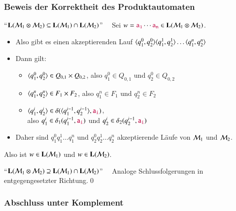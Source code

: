 \documentclass[onlymath]{beamer}
\begin{document}
\begin{frame}\frametitle{Beweis der Korrektheit des Produktautomaten}

"`$\textbf{\textcolor{black}{L}}(\mathcal{M}_1\otimes\mathcal{M}_2) \subseteq \textbf{\textcolor{black}{L}}(\mathcal{M}_1)\cap\textbf{\textcolor{black}{L}}(\mathcal{M}_2)$"'~~ Sei $w=\mathtt{\textcolor{purple}{a_1}}\cdots\mathtt{\textcolor{purple}{a_n}}\in\textbf{\textcolor{black}{L}}(\mathcal{M}_1\otimes\mathcal{M}_2)$.\pause
\begin{itemize}
\item Also gibt es einen akzeptierenden Lauf $\langle{q_1^0,q_2^0}\rangle\langle{q_1^1,q_2^1}\rangle\ldots\langle{q_1^n,q_2^n}\rangle$\pause
\item Dann gilt:
\begin{itemize}
\item $\langle{q_1^0,q_2^0}\rangle\in Q_{0,1}\times Q_{0,2}$, also $q_1^0\in Q_{0,1}$ und $q_2^0\in Q_{0,2}$
\item $\langle{q_1^n,q_2^n}\rangle\in F_1\times F_2$, also $q_1^n\in F_1$ und $q_2^n\in F_2$
\item $\langle{q_1^i,q_2^i}\rangle\in \delta(\langle{q_1^{i-1},q_2^{i-1}}\rangle,\mathtt{\textcolor{purple}{a_i}})$,\\ also
$q_1^i\in \delta_1(q_1^{i-1},\mathtt{\textcolor{purple}{a_i}})$ und $q_2^i\in \delta_2(q_2^{i-1},\mathtt{\textcolor{purple}{a_i}})$\pause
\end{itemize}
\item Daher sind $q_1^0 q_1^1 \ldots q_1^n$ und $q_2^0 q_2^1 \ldots q_2^n$ akzeptierende Läufe von $\mathcal{M}_1$ und $\mathcal{M}_2$.\pause
\end{itemize}
Also ist $w\in\textbf{\textcolor{black}{L}}(\mathcal{M}_1)$ und $w\in\textbf{\textcolor{black}{L}}(\mathcal{M}_2)$.\pause
\bigskip

"`$\textbf{\textcolor{black}{L}}(\mathcal{M}_1\otimes\mathcal{M}_2) \supseteq \textbf{\textcolor{black}{L}}(\mathcal{M}_1)\cap\textbf{\textcolor{black}{L}}(\mathcal{M}_2)$"'~~
Analoge Schlussfolgerungen in entgegengesetzter Richtung.\qed

\end{frame}

\begin{frame}\frametitle{Abschluss unter Komplement}


\end{frame}
\end{document}
